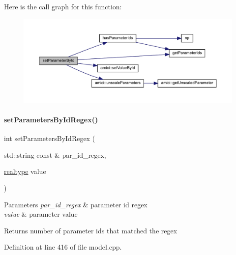 Here is the call graph for this function\+:
\nopagebreak
\begin{figure}[H]
\begin{center}
\leavevmode
\includegraphics[width=350pt]{classamici_1_1_model_a995357a19663980279249d4b89a88f7a_cgraph}
\end{center}
\end{figure}
\mbox{\label{classamici_1_1_model_ab66d6b754637ed68449af96f5887a0be}} 
\paragraph{\texorpdfstring{set\+Parameters\+By\+Id\+Regex()}{setParametersByIdRegex()}}
{\footnotesize\ttfamily int set\+Parameters\+By\+Id\+Regex (\begin{DoxyParamCaption}\item[{std\+::string const \&}]{par\+\_\+id\+\_\+regex,  }\item[{\mbox{\hyperlink{namespaceamici_a1bdce28051d6a53868f7ccbf5f2c14a3}{realtype}}}]{value }\end{DoxyParamCaption})}


\begin{DoxyParams}{Parameters}
{\em par\+\_\+id\+\_\+regex} & parameter id regex \\
\hline
{\em value} & parameter value \\
\hline
\end{DoxyParams}
\begin{DoxyReturn}{Returns}
number of parameter ids that matched the regex 
\end{DoxyReturn}


Definition at line 416 of file model.\+cpp.

